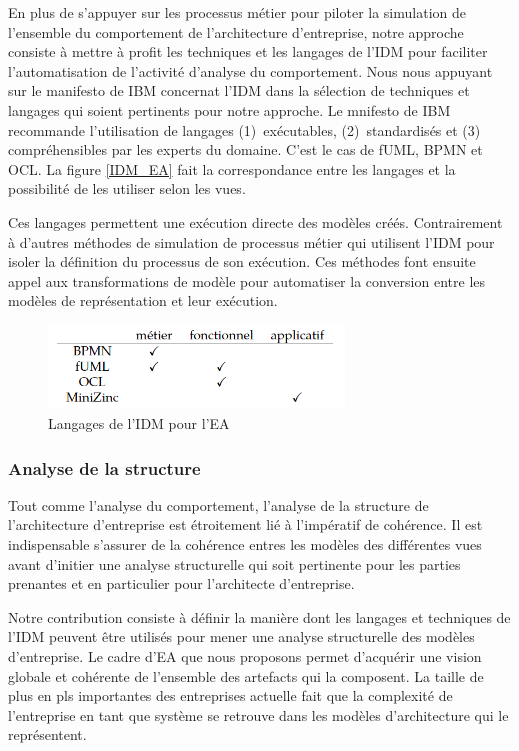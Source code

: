 En plus de s'appuyer sur les processus métier pour piloter la simulation de l'ensemble du comportement de l'architecture d'entreprise, notre approche consiste à mettre à profit les techniques et les langages de l'IDM pour faciliter l'automatisation de l'activité d'analyse du comportement. Nous nous appuyant sur le manifesto de IBM \cite{chesbrough2006research} concernat l'IDM dans la sélection de techniques et langages qui soient pertinents pour notre approche. Le mnifesto de IBM recommande l'utilisation de langages (1)~exécutables, (2)~standardisés et (3) compréhensibles par les experts du domaine. C'est le cas de fUML, BPMN et OCL. La figure \ref{IDM_EA} fait la correspondance entre les langages et la possibilité de les utiliser selon les vues. 

Ces langages permettent une exécution directe des modèles créés. Contrairement à d'autres méthodes de simulation de processus métier qui utilisent l'IDM pour isoler la définition du processus de son exécution. Ces méthodes font ensuite appel aux transformations de modèle pour automatiser la conversion entre les modèles de représentation et leur exécution. 



\begin{figure}[!htbp]
 \begin{center}
  \includegraphics[width=0.7\textwidth]{images/demarche/langages_vues.png}
 \end{center}
 \caption{Langages de l'IDM pour l'EA}
 \label{fig:IDM_EA}
\end{figure}


\subsubsection{Analyse de la structure}
Tout comme l'analyse du comportement, l'analyse de la structure de l'architecture d'entreprise est étroitement lié à l'impératif de cohérence.  Il est indispensable s'assurer de la cohérence entres les modèles des différentes vues avant d'initier une analyse structurelle qui soit pertinente pour les parties prenantes et en particulier pour l'architecte d'entreprise. 

Notre contribution consiste à définir la manière dont les langages et techniques de l'IDM peuvent être utilisés pour mener une analyse structurelle des modèles d'entreprise. Le cadre d'EA que nous proposons permet d'acquérir une vision globale et cohérente de l'ensemble des artefacts qui la composent. La taille de plus en pls importantes des entreprises actuelle fait que la complexité de l'entreprise en tant que système se retrouve dans les modèles d'architecture qui le représentent.

